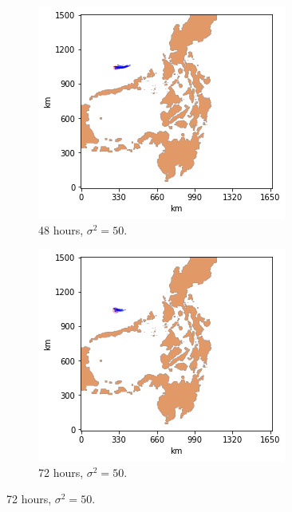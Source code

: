 \documentclass[11pt, english]{article}
\begin{document}
\begin{multicols}{2}
\begin{figure}
	\begin{subfigure}{0.33\textwidth}
		\centering
		\caption{48 hours, $\sigma^{2} = 50$.}
		\label{fig:toy-48-50}
		\includegraphics[width=\textwidth]{toy-48-50}
	\end{subfigure}\hfill
	\begin{subfigure}{0.33\textwidth}
		\centering
		\caption{72 hours, $\sigma^{2} = 50$.}
		\label{fig:toy-72-50}
		\includegraphics[width=\textwidth]{toy-72-50}
	\end{subfigure}

\end{figure}
\end{multicols}
\end{document}
